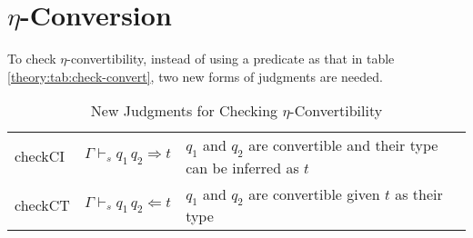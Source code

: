 \section{$\eta$-Conversion}\label{apdix:eta}
To check $\eta$-convertibility, instead of using a predicate as that in table \ref{theory:tab:check-convert}, two new forms of judgments are needed.
\begin{table}[h]
  \centering
  \begin{tabular}{l l l}
    checkCI & $\Gamma \vdash_s q_1\,q_2 \Rightarrow t$ & $q_1$ and $q_2$ are convertible and their type can be inferred as $t$\\
    checkCT & $\Gamma \vdash_s q_1\,q_2 \Leftarrow t$ & $q_1$ and $q_2$ are convertible given $t$ as their type
  \end{tabular}
  \caption{New Judgments for Checking $\eta$-Convertibility}
  \label{apdix:tab:eta}
\end{table}

